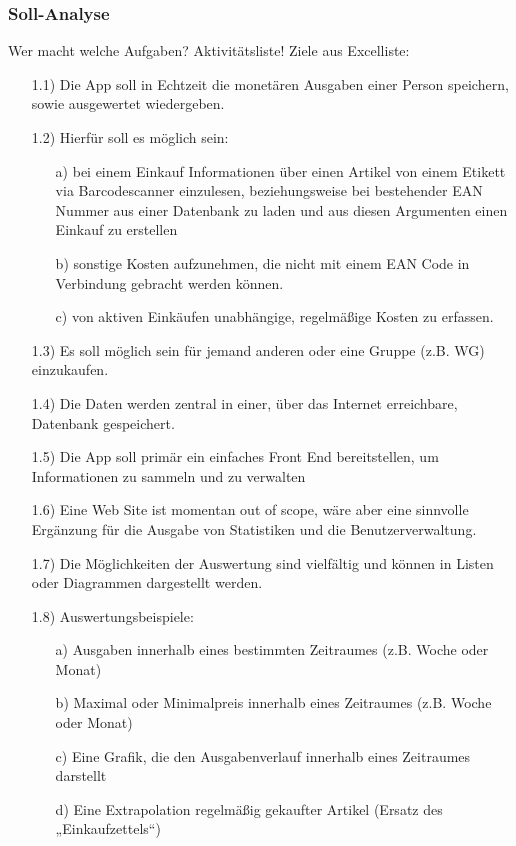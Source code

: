 \documentclass[12pt,a4paper]{article}
\begin{document}
\subsubsection{Soll-Analyse}
Wer macht welche Aufgaben? Aktivitätsliste!
Ziele aus Excelliste:
\begin{itemize}
 \item[1.1)] Die App soll in Echtzeit die monetären Ausgaben einer Person speichern, sowie ausgewertet wiedergeben.
 \item[1.2)] Hierfür soll es möglich sein:
 \begin{itemize}
 \item[a)] bei einem Einkauf Informationen über einen Artikel von einem Etikett via Barcodescanner einzulesen, beziehungsweise bei bestehender EAN Nummer aus einer Datenbank zu laden und aus diesen Argumenten einen Einkauf zu erstellen
  \item[b)] sonstige Kosten aufzunehmen, die nicht mit einem EAN Code in Verbindung gebracht werden können.
  \item[c)] von aktiven Einkäufen unabhängige, regelmäßige Kosten zu erfassen.
  \end{itemize}
 \item[1.3)] Es soll möglich sein für jemand anderen oder eine Gruppe (z.B. WG) einzukaufen.
 \item[1.4)] Die Daten werden zentral in einer, über das Internet erreichbare, Datenbank gespeichert.
 \item[1.5)] Die App soll primär ein einfaches Front End bereitstellen, um Informationen zu sammeln und zu verwalten
 \item[1.6)] Eine Web Site ist momentan out of scope, wäre aber eine sinnvolle Ergänzung für die Ausgabe von Statistiken und die Benutzerverwaltung.
 \item[1.7)] Die Möglichkeiten der Auswertung sind vielfältig und können in Listen oder Diagrammen dargestellt werden.
 \item[1.8)] Auswertungsbeispiele:
 \begin{itemize}
\item[a)]Ausgaben innerhalb eines bestimmten Zeitraumes (z.B. Woche oder Monat)
 \item[b)] Maximal oder Minimalpreis innerhalb eines Zeitraumes (z.B. Woche oder Monat) 
\item[c)] Eine Grafik, die den Ausgabenverlauf innerhalb eines Zeitraumes darstellt
\item[d)] Eine Extrapolation regelmäßig gekaufter Artikel (Ersatz des „Einkaufzettels“)

\end{itemize}
\end{itemize}
\end{document}
